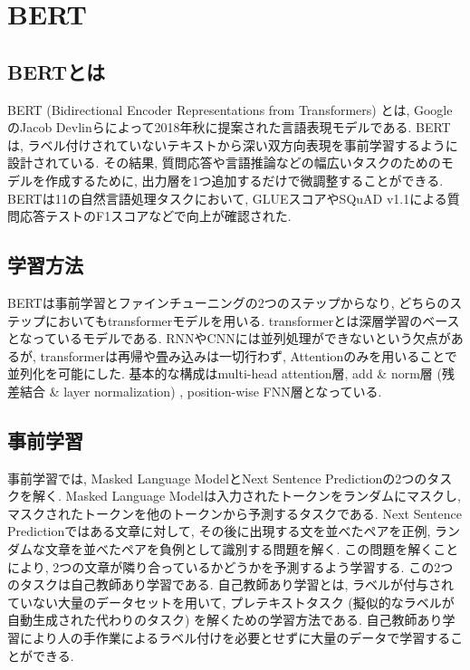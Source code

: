 
\section{BERT}
\subsection{BERTとは}
BERT (Bidirectional Encoder Representations from Transformers) \cite{bert}とは, GoogleのJacob Devlinらによって2018年秋に提案された言語表現モデルである. BERTは, ラベル付けされていないテキストから深い双方向表現を事前学習するように設計されている. その結果, 質問応答や言語推論などの幅広いタスクのためのモデルを作成するために, 出力層を1つ追加するだけで微調整することができる. 
BERTは11の自然言語処理タスクにおいて, GLUEスコアやSQuAD v1.1による質問応答テストのF1スコアなどで向上が確認された. \cite{bert}

\subsection{学習方法}
BERTは事前学習とファインチューニングの2つのステップからなり, どちらのステップにおいてもtransformerモデルを用いる. transformerとは深層学習のベースとなっているモデルである. RNNやCNNには並列処理ができないという欠点があるが, transformerは再帰や畳み込みは一切行わず, Attentionのみを用いることで並列化を可能にした. 基本的な構成はmulti-head attention層, add \& norm層 (残差結合 \& layer normalization) , position-wise FNN層となっている. 

\subsection{事前学習}
事前学習では, Masked Language ModelとNext Sentence Predictionの2つのタスクを解く. Masked Language Modelは入力されたトークンをランダムにマスクし, マスクされたトークンを他のトークンから予測するタスクである. Next Sentence Predictionではある文章に対して, その後に出現する文を並べたペアを正例, ランダムな文章を並べたペアを負例として識別する問題を解く. この問題を解くことにより, 2つの文章が隣り合っているかどうかを予測するよう学習する. 
この2つのタスクは自己教師あり学習である. 自己教師あり学習とは, ラベルが付与されていない大量のデータセットを用いて, プレテキストタスク (擬似的なラベルが自動生成された代わりのタスク) を解くための学習方法である. 自己教師あり学習により人の手作業によるラベル付けを必要とせずに大量のデータで学習することができる. 

